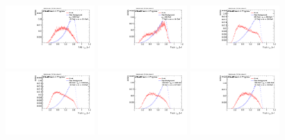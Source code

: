 \begin{figure}
\includegraphics[width=0.3\textwidth]{sascha_input/Appendix/Distributions/top/distributions/beta1/h_assisted_tj_nSub32_bin6.pdf} 
\bigskip
\includegraphics[width=0.3\textwidth]{sascha_input/Appendix/Distributions/top/distributions/beta1/h_normal_tj_nSub32_bin1.pdf} \hspace{1mm}
\includegraphics[width=0.3\textwidth]{sascha_input/Appendix/Distributions/top/distributions/beta1/h_normal_tj_nSub32_bin2.pdf} \hspace{1mm}
\includegraphics[width=0.3\textwidth]{sascha_input/Appendix/Distributions/top/distributions/beta1/h_normal_tj_nSub32_bin3.pdf} 
\bigskip
\includegraphics[width=0.3\textwidth]{sascha_input/Appendix/Distributions/top/distributions/beta1/h_normal_tj_nSub32_bin4.pdf} \hspace{1mm}
\includegraphics[width=0.3\textwidth]{sascha_input/Appendix/Distributions/top/distributions/beta1/h_normal_tj_nSub32_bin5.pdf} \hspace{1mm}

\end{figure}
